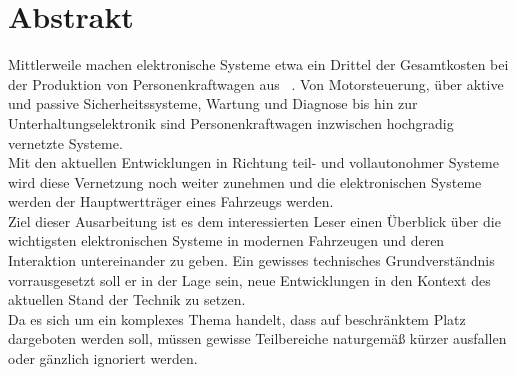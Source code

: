\section{Abstrakt}
Mittlerweile machen elektronische Systeme etwa ein Drittel der Gesamtkosten bei der Produktion von
Personenkraftwagen aus ~\cite{.BP02}. Von Motorsteuerung, über aktive und passive Sicherheitssysteme, 
Wartung und Diagnose bis hin zur Unterhaltungselektronik sind Personenkraftwagen inzwischen hochgradig
vernetzte Systeme.\\
Mit den aktuellen Entwicklungen in Richtung teil- und vollautonohmer Systeme wird diese Vernetzung noch weiter zunehmen 
und die elektronischen Systeme werden der Hauptwertträger eines Fahrzeugs werden.\\

Ziel dieser Ausarbeitung ist es dem interessierten Leser einen Überblick über die wichtigsten elektronischen Systeme in
modernen Fahrzeugen und deren Interaktion untereinander zu geben. Ein gewisses technisches Grundverständnis vorrausgesetzt 
soll er in der Lage sein, neue Entwicklungen in den Kontext des aktuellen Stand der Technik zu setzen.\\

Da es sich um ein komplexes Thema handelt, dass auf beschränktem Platz dargeboten werden soll, müssen gewisse Teilbereiche naturgemäß
kürzer ausfallen oder gänzlich ignoriert werden.  